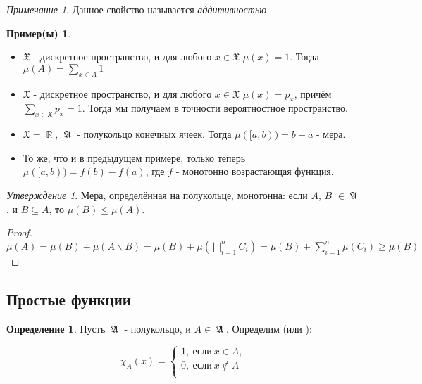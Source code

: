 \documentclass[a4paper]{article}
\theoremstyle{indented}
\theoremstyle{definition}
\newtheorem{defn}{Определение}
\newtheorem{exl}{Пример(ы)}
\theoremstyle{remark}
\newtheorem{remark}{Примечание}
\newtheorem{stat}{Утверждение}
\DeclareMathOperator{\RR}{\mathbb{R}}
\DeclareMathOperator{\GA}{\mathfrak{A}}
\begin{document}
\begin{remark}
    Данное свойство называется \textit{аддитивностью}
\end{remark}

\begin{exl}
    \
    \begin{itemize}
        \item $\mathfrak{X}$ - дискретное пространство, и для любого $x \in \mathfrak{X}$ $\mu({x})=1$. Тогда $\mu(A)=\sum_{x \in A} 1$
        \item $\mathfrak{X}$ - дискретное пространство, и для любого $x \in \mathfrak{X}$ $\mu({x})=p_x$, причём $\sum_{x \in \mathfrak{X}} p_x=1$. Тогда мы получаем в точности вероятностное пространство.
        \item $\mathfrak{X}=\RR$, $\GA$ - полукольцо конечных ячеек. Тогда $\mu([a, b))=b-a$ - мера.
        \item То же, что и в предыдущем примере, только теперь $\mu([a, b))=f(b)-f(a)$, где $f$ - монотонно возрастающая функция.
    \end{itemize}
\end{exl}

\begin{stat}
    Мера, определённая на полукольце, монотонна: если $A$, $B$ $\in \GA$, и $B \subseteq A$, то $\mu(B) \leq \mu(A)$.
\end{stat}

\begin{proof}
    $\mu(A)=\mu(B)+\mu(A \backslash B) = \mu(B)+\mu(\bigsqcup_{i=1}^n C_i)=\mu(B)+\sum_{i=1}^n \mu(C_i) \geq \mu(B)$
\end{proof}

\subsection{Простые функции}

\begin{defn}
    Пусть $\GA$ - полукольцо, и $A \in \GA$. Определим  (или ): 

\begin{equation*}
    \chi_A(x)=
  \begin{cases}
     1 , \: \text{если} \: x \in A, \\
     0 , \: \text{если} \: x \notin A\\
  \end{cases}
\end{equation*}

\end{defn}
\end{document}
